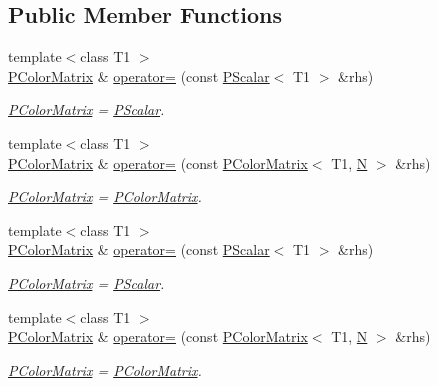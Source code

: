 \subsection*{Public Member Functions}
\begin{DoxyCompactItemize}
\item 
{\footnotesize template$<$class T1 $>$ }\\\mbox{\hyperlink{classENSEM_1_1PColorMatrix}{P\+Color\+Matrix}} \& \mbox{\hyperlink{classENSEM_1_1PColorMatrix_a7750e72b224e47b6a559f3dc112b72d3}{operator=}} (const \mbox{\hyperlink{classENSEM_1_1PScalar}{P\+Scalar}}$<$ T1 $>$ \&rhs)
\begin{DoxyCompactList}\small\item\em \mbox{\hyperlink{classENSEM_1_1PColorMatrix}{P\+Color\+Matrix}} = \mbox{\hyperlink{classENSEM_1_1PScalar}{P\+Scalar}}. \end{DoxyCompactList}\item 
{\footnotesize template$<$class T1 $>$ }\\\mbox{\hyperlink{classENSEM_1_1PColorMatrix}{P\+Color\+Matrix}} \& \mbox{\hyperlink{classENSEM_1_1PColorMatrix_a529b6a2c63f2087a6a336af14b6f80eb}{operator=}} (const \mbox{\hyperlink{classENSEM_1_1PColorMatrix}{P\+Color\+Matrix}}$<$ T1, \mbox{\hyperlink{operator__name__util_8cc_a7722c8ecbb62d99aee7ce68b1752f337}{N}} $>$ \&rhs)
\begin{DoxyCompactList}\small\item\em \mbox{\hyperlink{classENSEM_1_1PColorMatrix}{P\+Color\+Matrix}} = \mbox{\hyperlink{classENSEM_1_1PColorMatrix}{P\+Color\+Matrix}}. \end{DoxyCompactList}\item 
{\footnotesize template$<$class T1 $>$ }\\\mbox{\hyperlink{classENSEM_1_1PColorMatrix}{P\+Color\+Matrix}} \& \mbox{\hyperlink{classENSEM_1_1PColorMatrix_a7750e72b224e47b6a559f3dc112b72d3}{operator=}} (const \mbox{\hyperlink{classENSEM_1_1PScalar}{P\+Scalar}}$<$ T1 $>$ \&rhs)
\begin{DoxyCompactList}\small\item\em \mbox{\hyperlink{classENSEM_1_1PColorMatrix}{P\+Color\+Matrix}} = \mbox{\hyperlink{classENSEM_1_1PScalar}{P\+Scalar}}. \end{DoxyCompactList}\item 
{\footnotesize template$<$class T1 $>$ }\\\mbox{\hyperlink{classENSEM_1_1PColorMatrix}{P\+Color\+Matrix}} \& \mbox{\hyperlink{classENSEM_1_1PColorMatrix_a529b6a2c63f2087a6a336af14b6f80eb}{operator=}} (const \mbox{\hyperlink{classENSEM_1_1PColorMatrix}{P\+Color\+Matrix}}$<$ T1, \mbox{\hyperlink{operator__name__util_8cc_a7722c8ecbb62d99aee7ce68b1752f337}{N}} $>$ \&rhs)
\begin{DoxyCompactList}\small\item\em \mbox{\hyperlink{classENSEM_1_1PColorMatrix}{P\+Color\+Matrix}} = \mbox{\hyperlink{classENSEM_1_1PColorMatrix}{P\+Color\+Matrix}}. \end{DoxyCompactList}\end{DoxyCompactItemize}
